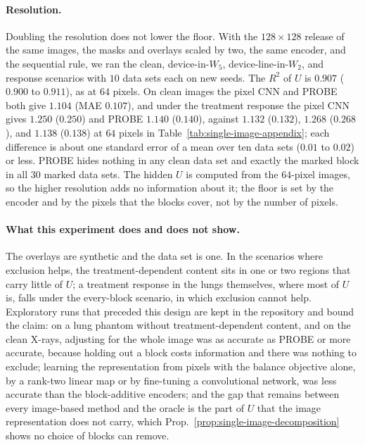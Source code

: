 \paragraph{Resolution.} Doubling the resolution does not lower the floor. With the $128\times128$ release of the same images, the masks and overlays scaled by two, the same encoder, and the sequential rule, we ran the clean, device-in-$W_5$, device-line-in-$W_2$, and response scenarios with $10$ data sets each on new seeds. The $R^2$ of $U$ is $0.907$ ($0.900$ to $0.911$), as at $64$ pixels. On clean images the pixel CNN and PROBE both give $1.104$ (MAE $0.107$), and under the treatment response the pixel CNN gives $1.250$ ($0.250$) and PROBE $1.140$ ($0.140$), against $1.132$ ($0.132$), $1.268$ ($0.268$), and $1.138$ ($0.138$) at $64$ pixels in Table~\ref{tab:single-image-appendix}; each difference is about one standard error of a mean over ten data sets ($0.01$ to $0.02$) or less. PROBE hides nothing in any clean data set and exactly the marked block in all $30$ marked data sets. The hidden $U$ is computed from the $64$-pixel images, so the higher resolution adds no information about it; the floor is set by the encoder and by the pixels that the blocks cover, not by the number of pixels.

\paragraph{What this experiment does and does not show.} The overlays are synthetic and the data set is one. In the scenarios where exclusion helps, the treatment-dependent content sits in one or two regions that carry little of $U$; a treatment response in the lungs themselves, where most of $U$ is, falls under the every-block scenario, in which exclusion cannot help. Exploratory runs that preceded this design are kept in the repository and bound the claim: on a lung phantom without treatment-dependent content, and on the clean X-rays, adjusting for the whole image was as accurate as PROBE or more accurate, because holding out a block costs information and there was nothing to exclude; learning the representation from pixels with the balance objective alone, by a rank-two linear map or by fine-tuning a convolutional network, was less accurate than the block-additive encoders; and the gap that remains between every image-based method and the oracle is the part of $U$ that the image representation does not carry, which Prop.~\ref{prop:single-image-decomposition} shows no choice of blocks can remove.

